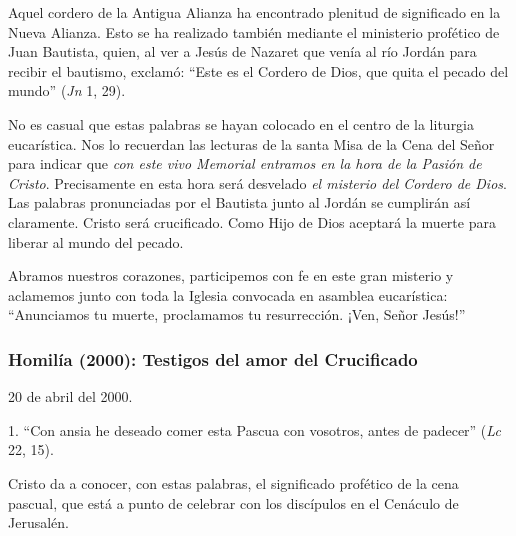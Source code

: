 			\begin{body}Aquel cordero de la Antigua Alianza ha encontrado plenitud de significado en la Nueva Alianza. Esto se ha realizado también mediante el ministerio profético de Juan Bautista, quien, al ver a Jesús de Nazaret que venía al río Jordán para recibir el bautismo, exclamó: “Este es el Cordero de Dios, que quita el pecado del mundo” (\textit{Jn} 1, 29).\end{body}
			
			\begin{body}No es casual que estas palabras se hayan colocado en el centro de la liturgia eucarística. Nos lo recuerdan las lecturas de la santa Misa de la Cena del Señor para indicar que \textit{con este vivo Memorial entramos en la hora de la Pasión de Cristo}. Precisamente en esta hora será desvelado \textit{el misterio del Cordero de Dios}. Las palabras pronunciadas por el Bautista junto al Jordán se cumplirán así claramente. Cristo será crucificado. Como Hijo de Dios aceptará la muerte para liberar al mundo del pecado.\end{body}
			
			\begin{body}Abramos nuestros corazones, participemos con fe en este gran misterio y aclamemos junto con toda la Iglesia convocada en asamblea eucarística: “Anunciamos tu muerte, proclamamos tu resurrección. ¡Ven, Señor Jesús!”\end{body}
			
			\subsubsection{Homilía (2000): Testigos del amor del Crucificado}
			
			\begin{referencia}20 de abril del 2000.\end{referencia}
			
			\begin{body}1. “Con ansia he deseado comer esta Pascua con vosotros, antes de padecer” (\textit{Lc} 22, 15).\end{body}
			
			\begin{body}Cristo da a conocer, con estas palabras, el significado profético de la cena pascual, que está a punto de celebrar con los discípulos en el Cenáculo de Jerusalén.\end{body}
			
